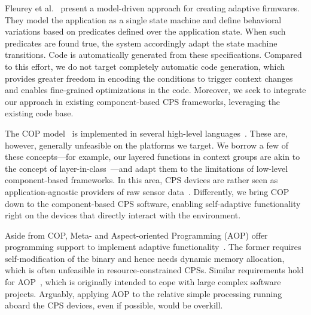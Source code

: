Fleurey et al.~\cite{Fleureya-adaptive-firmwares11} present a
model-driven approach for creating adaptive firmwares. They model the
application as a single state machine and define behavioral variations
based on predicates defined over the application state. When such
predicates are found true, the system accordingly adapt the state
machine transitions. Code is automatically generated from these
specifications. Compared to this effort, we do not target completely
automatic code generation, which provides greater freedom in encoding
the conditions to trigger context changes and enables fine-grained
optimizations in the code. Moreover, we seek to integrate our approach
in existing component-based CPS frameworks, leveraging the existing
code base.

The COP model~\cite{Hirschfeld08} is implemented in several high-level
languages~\cite{Bardram05,Ghezzi10,Kamina11,Salvaneschi12,Sehic11}. These
are, however, generally unfeasible on the platforms we target. We
borrow a few of these concepts---for example, our layered functions in
context groups are akin to the concept of
layer-in-class~\cite{Salvaneschi12}---and adapt them to the
limitations of low-level component-based frameworks. In this area, CPS
devices are rather seen as application-agnostic providers of raw
sensor data~\cite{Sehic11}. Differently, we bring COP down to the
component-based CPS software, enabling self-adaptive functionality
right on the devices that directly interact with the environment.

Aside from COP, Meta- and Aspect-oriented Programming (AOP) offer
programming support to implement adaptive
functionality~\cite{SalvaneschiTBP}. The former requires
self-modification of the binary and hence needs dynamic
memory allocation, which is often unfeasible in resource-constrained
CPSs. Similar requirements hold for AOP~\cite{Kiczales:AOP:97}, which
is originally intended to cope with large complex software
projects. Arguably, applying AOP to the relative simple processing
running aboard the CPS devices, even if possible, would be overkill.



